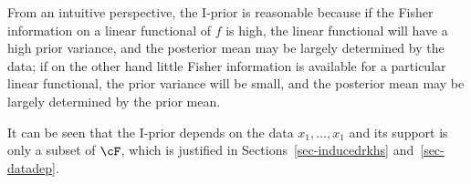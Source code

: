 \documentclass[preprint,12pt,authoryear]{elsarticle}
\DeclarePairedDelimiter{\norm}{\lVert}{\rVert}
\begin{document}
From an intuitive perspective, the I-prior is reasonable because if the Fisher information on a linear functional of $f$ is high, the linear functional will have a high prior variance, and the posterior mean may be largely determined by the data; if on the other hand little Fisher information is available for a particular linear functional, the prior variance will be small, and the posterior mean may be largely determined by the prior mean. 









It can be seen that the I-prior depends on the data $x_1,\ldots,x_1$ and its support is only a subset of $\cF$, which is justified in Sections~\ref{sec-inducedrkhs} and~\ref{sec-datadep}.
\end{document}
